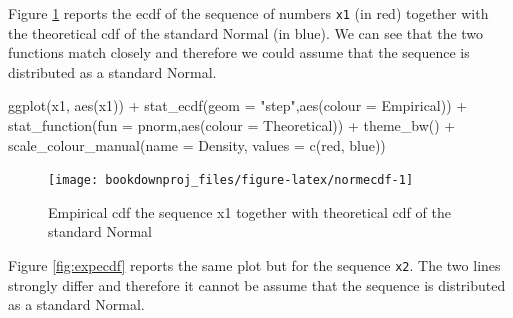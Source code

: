 \documentclass[
]{book}
\newenvironment{Shaded}{\begin{snugshade}}{\end{snugshade}}
\newcommand{\AttributeTok}[1]{\textcolor[rgb]{0.77,0.63,0.00}{#1}}
\newcommand{\FunctionTok}[1]{\textcolor[rgb]{0.00,0.00,0.00}{#1}}
\newcommand{\NormalTok}[1]{#1}
\newcommand{\SpecialCharTok}[1]{\textcolor[rgb]{0.00,0.00,0.00}{#1}}
\newcommand{\StringTok}[1]{\textcolor[rgb]{0.31,0.60,0.02}{#1}}
\begin{document}
Figure \ref{fig:normecdf} reports the ecdf of the sequence of numbers \texttt{x1} (in red) together with the theoretical cdf of the standard Normal (in blue). We can see that the two functions match closely and therefore we could assume that the sequence is distributed as a standard Normal.

\begin{Shaded}
\begin{Highlighting}[]
\FunctionTok{ggplot}\NormalTok{(x1, }\FunctionTok{aes}\NormalTok{(x1)) }\SpecialCharTok{+}
   \FunctionTok{stat\_ecdf}\NormalTok{(}\AttributeTok{geom =} \StringTok{"step"}\NormalTok{,}\FunctionTok{aes}\NormalTok{(}\AttributeTok{colour =} \StringTok{\textquotesingle{}Empirical\textquotesingle{}}\NormalTok{)) }\SpecialCharTok{+}
   \FunctionTok{stat\_function}\NormalTok{(}\AttributeTok{fun =}\NormalTok{ pnorm,}\FunctionTok{aes}\NormalTok{(}\AttributeTok{colour =} \StringTok{\textquotesingle{}Theoretical\textquotesingle{}}\NormalTok{)) }\SpecialCharTok{+}
   \FunctionTok{theme\_bw}\NormalTok{() }\SpecialCharTok{+}      
   \FunctionTok{scale\_colour\_manual}\NormalTok{(}\AttributeTok{name =} \StringTok{\textquotesingle{}Density\textquotesingle{}}\NormalTok{, }\AttributeTok{values =} \FunctionTok{c}\NormalTok{(}\StringTok{\textquotesingle{}red\textquotesingle{}}\NormalTok{, }\StringTok{\textquotesingle{}blue\textquotesingle{}}\NormalTok{))}
\end{Highlighting}
\end{Shaded}

\begin{figure}

{\centering \texttt{[image: bookdownproj\_files/figure-latex/normecdf-1]} 

}

\caption{Empirical cdf the sequence x1 together with theoretical cdf of the standard Normal}\label{fig:normecdf}
\end{figure}

Figure \ref{fig:expecdf} reports the same plot but for the sequence \texttt{x2}. The two lines strongly differ and therefore it cannot be assume that the sequence is distributed as a standard Normal.
\end{document}
